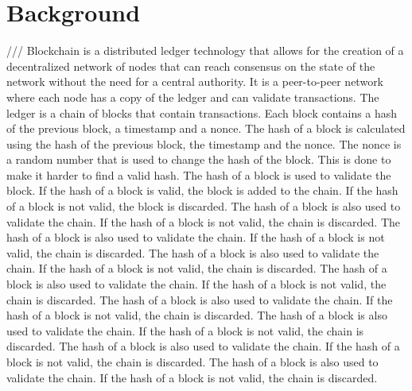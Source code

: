 \section{Background}

///
Blockchain is a distributed ledger technology that allows for the creation of a decentralized network of nodes that can reach consensus on the state of the network without the need for a central authority. It is a peer-to-peer network where each node has a copy of the ledger and can validate transactions. The ledger is a chain of blocks that contain transactions. Each block contains a hash of the previous block, a timestamp and a nonce. The hash of a block is calculated using the hash of the previous block, the timestamp and the nonce. The nonce is a random number that is used to change the hash of the block. This is done to make it harder to find a valid hash. The hash of a block is used to validate the block. If the hash of a block is valid, the block is added to the chain. If the hash of a block is not valid, the block is discarded. The hash of a block is also used to validate the chain. If the hash of a block is not valid, the chain is discarded. The hash of a block is also used to validate the chain. If the hash of a block is not valid, the chain is discarded. The hash of a block is also used to validate the chain. If the hash of a block is not valid, the chain is discarded. The hash of a block is also used to validate the chain. If the hash of a block is not valid, the chain is discarded. The hash of a block is also used to validate the chain. If the hash of a block is not valid, the chain is discarded. The hash of a block is also used to validate the chain. If the hash of a block is not valid, the chain is discarded. The hash of a block is also used to validate the chain. If the hash of a block is not valid, the chain is discarded. The hash of a block is also used to validate the chain. If the hash of a block is not valid, the chain is discarded.
